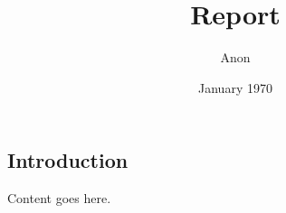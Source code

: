\documentclass[12pt]{report}
\title{Report}
\author{Anon}
\date{January 1970}
\begin{document}


        \maketitle

        \tableofcontents
        \listoffigures
        \listoftables

        \titleformat{\chapter}[display]
        {\normalfont\bfseries\Huge}{}{0pt}{\thechapter\quad}
        \begin{flushleft}

    
    \chapter{Introduction}

    Content goes here.

\end{flushleft}
\end{document}
